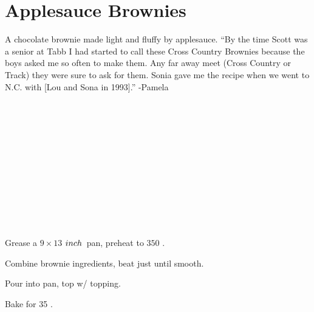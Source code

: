 \section[Applesauce Brownies]{Applesauce Brownies}


\begin{recipestats}[
	servings=16,
	preptime=15~\minute,
	bakingtime=35~\minute,
	source=Pam \& Sonia,
]
\end{recipestats}


\begin{recipeabstract}
	A chocolate brownie made light and fluffy by applesauce.
	``By the time Scott was a senior at Tabb I had started to call these Cross Country Brownies because the boys asked me so often to make them.
	Any far away meet (Cross Country or Track) they were sure to ask for them.
	Sonia gave me the recipe when we went to N.C. with [Lou and Sona in 1993].'' -Pamela
\end{recipeabstract}


\begin{ingredientcolumns}
	\begin{ingredientblock}[brownie]
		\\
		\\
		\\
		\\
		\\
		\\
		\\
		\\
	\end{ingredientblock}
	\begin{ingredientblock}[topping]
		\\
		\\
	\end{ingredientblock}
\end{ingredientcolumns}


\pagebreak[1] %
\begin{preparation}
\item Grease a $9\times13$ $inch$~pan, preheat to $350$ \Fahrenheit.
\item Combine brownie ingredients, beat just until smooth.
\item Pour into pan, top w/ topping.
\item Bake for 35 \minute.
\end{preparation}


\recipeend%
